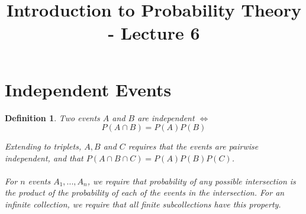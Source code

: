 \documentclass[12pt]{article} %
\date{}
\title{Introduction to Probability Theory - Lecture 6}
\newtheorem{defn}{Definition}
\begin{document}
\maketitle
\section{Independent Events}
\begin{defn}
Two events $A$ and $B$ are \emph{independent} $\iff$ 
$$P(A\cap B) = P(A)P(B)$$

Extending to triplets, $A,B$ and $C$ requires that the events are pairwise independent, and that $P(A\cap B \cap C) = P(A)P(B)P(C)$.\\\\

For $n$ events $A_1,...,A_n$, we require that probability of any possible intersection is the product of the probability of each of the events in the intersection. For an infinite collection, we require that all finite subcollections have this property.
\end{defn}
\end{document}
